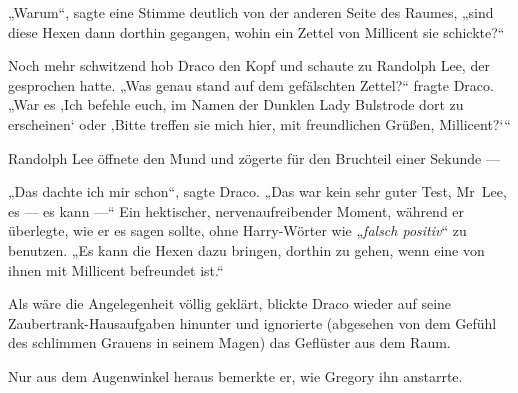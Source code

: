 „Warum“, sagte eine Stimme deutlich von der anderen Seite des Raumes, „sind diese Hexen dann dorthin gegangen, wohin ein Zettel von Millicent sie schickte?“

Noch mehr schwitzend hob Draco den Kopf und schaute zu Randolph Lee, der gesprochen hatte.
„Was genau stand auf dem gefälschten Zettel?“ fragte Draco.
„War es ‚Ich befehle euch, im Namen der Dunklen Lady Bulstrode dort zu erscheinen‘ oder ‚Bitte treffen sie mich hier, mit freundlichen Grüßen, Millicent?‘“

Randolph Lee öffnete den Mund und zögerte für den Bruchteil einer Sekunde —

„Das dachte ich mir schon“, sagte Draco.
„Das war kein sehr guter Test, Mr~Lee, es — es kann —“ Ein hektischer, nervenaufreibender Moment, während er überlegte, wie er es sagen sollte, ohne Harry-Wörter wie
„\emph{falsch positiv}“ zu benutzen.
„Es kann die Hexen dazu bringen, dorthin zu gehen, wenn eine von ihnen mit Millicent befreundet ist.“

Als wäre die Angelegenheit völlig geklärt, blickte Draco wieder auf seine Zaubertrank-Hausaufgaben hinunter und ignorierte (abgesehen von dem Gefühl des schlimmen Grauens in seinem Magen) das Geflüster aus dem Raum.

Nur aus dem Augenwinkel heraus bemerkte er, wie Gregory ihn anstarrte.

\later

